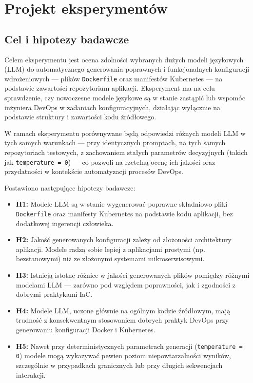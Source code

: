 \clearpage %
\section{Projekt eksperymentów}

\subsection{Cel i hipotezy badawcze}

Celem eksperymentu jest ocena zdolności wybranych dużych modeli językowych (LLM) do automatycznego generowania poprawnych i funkcjonalnych konfiguracji wdrożeniowych — plików \texttt{Dockerfile} oraz manifestów Kubernetes — na podstawie zawartości repozytorium aplikacji. Eksperyment ma na celu sprawdzenie, czy nowoczesne modele językowe są w stanie zastąpić lub wspomóc inżyniera DevOps w zadaniach konfiguracyjnych, działając wyłącznie na podstawie struktury i zawartości kodu źródłowego.

W ramach eksperymentu porównywane będą odpowiedzi różnych modeli LLM w tych samych warunkach — przy identycznych promptach, na tych samych repozytoriach testowych, z zachowaniem stałych parametrów decyzyjnych (takich jak \texttt{temperature = 0}) — co pozwoli na rzetelną ocenę ich jakości oraz przydatności w kontekście automatyzacji procesów DevOps.

\bigskip

\noindent Postawiono następujące hipotezy badawcze:

\begin{itemize}
    \item \textbf{H1:} Modele LLM są w stanie wygenerować poprawne składniowo pliki \texttt{Dockerfile} oraz manifesty Kubernetes na podstawie kodu aplikacji, bez dodatkowej ingerencji człowieka.
    
    \item \textbf{H2:} Jakość generowanych konfiguracji zależy od złożoności architektury aplikacji. Modele radzą sobie lepiej z aplikacjami prostymi (np. bezstanowymi) niż ze złożonymi systemami mikroserwisowymi.
    
    \item \textbf{H3:} Istnieją istotne różnice w jakości generowanych plików pomiędzy różnymi modelami LLM — zarówno pod względem poprawności, jak i zgodności z dobrymi praktykami IaC.
    
    \item \textbf{H4:} Modele LLM, uczone głównie na ogólnym kodzie źródłowym, mają trudność z konsekwentnym stosowaniem dobrych praktyk DevOps przy generowaniu konfiguracji Docker i Kubernetes.
    
    \item \textbf{H5:} Nawet przy deterministycznych parametrach generacji (\texttt{temperature = 0}) modele mogą wykazywać pewien poziom niepowtarzalności wyników, szczególnie w przypadkach granicznych lub przy długich sekwencjach interakcji.
\end{itemize}


